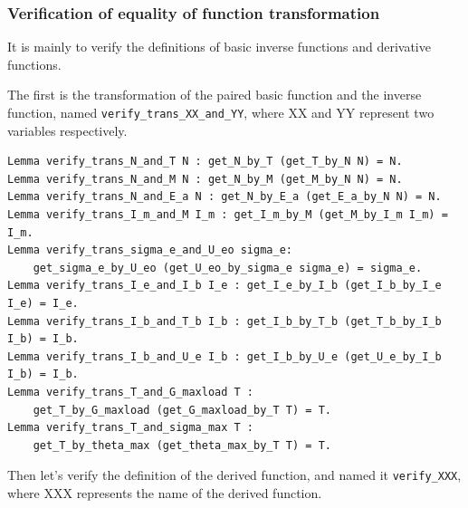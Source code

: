 \documentclass{article} %
\numberwithin{equation}{section} %
\begin{document}
\subsubsection{Verification of equality of function transformation}
It is mainly to verify the definitions of basic inverse functions and derivative functions.

The first is the transformation of the paired basic function and the inverse function, named \verb|verify_trans_XX_and_YY|, where XX and YY represent two variables respectively.

{\small
\begin{verbatim}
Lemma verify_trans_N_and_T N : get_N_by_T (get_T_by_N N) = N.
Lemma verify_trans_N_and_M N : get_N_by_M (get_M_by_N N) = N.
Lemma verify_trans_N_and_E_a N : get_N_by_E_a (get_E_a_by_N N) = N.
Lemma verify_trans_I_m_and_M I_m : get_I_m_by_M (get_M_by_I_m I_m) = I_m.
Lemma verify_trans_sigma_e_and_U_eo sigma_e: 
    get_sigma_e_by_U_eo (get_U_eo_by_sigma_e sigma_e) = sigma_e.
Lemma verify_trans_I_e_and_I_b I_e : get_I_e_by_I_b (get_I_b_by_I_e I_e) = I_e.
Lemma verify_trans_I_b_and_T_b I_b : get_I_b_by_T_b (get_T_b_by_I_b I_b) = I_b.
Lemma verify_trans_I_b_and_U_e I_b : get_I_b_by_U_e (get_U_e_by_I_b I_b) = I_b.
Lemma verify_trans_T_and_G_maxload T : 
    get_T_by_G_maxload (get_G_maxload_by_T T) = T.
Lemma verify_trans_T_and_sigma_max T : 
    get_T_by_theta_max (get_theta_max_by_T T) = T.
\end{verbatim}
}

Then let's verify the definition of the derived function, and named it \verb|verify_XXX|, where XXX represents the name of the derived function.
\end{document}
